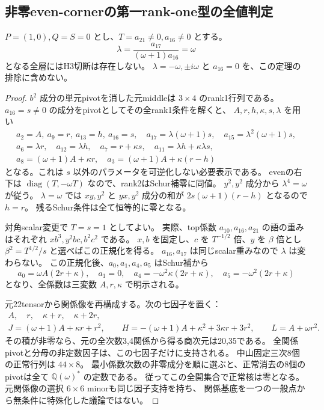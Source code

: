 \subsection{非零even-cornerの第一rank-one型の全値判定}
\label{subsec:cubic-third-root-unit-onezero-plus}
\begin{theorem}[片方零結合の $\lambda=\omega$ 型も空]
\label{thm:cubic-third-root-unit-onezero-plus-empty}
$P=(1,0),Q=S=0$ とし、$T=a_{21}\ne0,a_{16}\ne0$ とする。
\[
 \lambda=\frac{a_{17}}{(\omega+1)a_{16}}=\omega
\]
となる全層にはH3切断は存在しない。
$\lambda=-\omega,\pm i\omega$ と $a_{16}=0$ を、この定理の排除に含めない。
\end{theorem}
\begin{proof}
$b^2$ 成分の単元pivotを消した元middleは $3\times4$ のrank1行列である。
$a_{16}=s\ne0$ の成分をpivotとしてその全rank1条件を解くと、
$A,r,h,\kappa,s,\lambda$ を用い
\begin{gather*}
 a_2=A,\ a_9=r,\ a_{13}=h,\ a_{16}=s,\quad
 a_{17}=\lambda(\omega+1)s,\quad a_{15}=\lambda^2(\omega+1)s,\\
 a_6=\lambda r,\quad a_{12}=\lambda h,\quad
 a_7=r+\kappa s,\quad a_{11}=\lambda h+\kappa\lambda s,\\
 a_8=(\omega+1)A+\kappa r,\quad
 a_3=(\omega+1)A+\kappa(r-h)
\end{gather*}
となる。これは $s$ 以外のパラメータを可逆化しない必要表示である。
evenの右下は $\operatorname{diag}(T,-\omega T)$ なので、rank2はSchur補零に同値。
$y^2,y^2$ 成分から $\lambda^4=\omega$ が従う。
$\lambda=\omega$ では $xy,y^2$ と $yx,y^2$ 成分の和が
$2s(\omega+1)(r-h)$ となるので $h=r$。
残るSchur条件は全て恒等的に零となる。

対角scalar変更で $T=s=1$ としてよい。
実際、top係数 $a_{10},a_{16},a_{21}$ の語の重みはそれぞれ
$xb^3,y^2bc,b^2c^2$ である。
$x,b$ を固定し、$c$ を $T^{-1/2}$ 倍、$y$ を $\beta$ 倍とし
$\beta^2=T^{1/2}/s$ と選べばこの正規化を得る。
$a_{16},a_{17}$ は同じscalar重みなので $\lambda$ は変わらない。
この正規化後、$a_0,a_1,a_4,a_5$ はSchur補から
\[
 a_0=\omega A(2r+\kappa),\quad a_1=0,\quad
 a_4=-\omega^2\kappa(2r+\kappa),\quad a_5=-\omega^2(2r+\kappa)
\]
となり、全係数は三変数 $A,r,\kappa$ で明示される。

元22tensorから関係像を再構成する。次の七因子を置く：
\begin{gather*}
 A,\quad r,\quad \kappa+r,\quad \kappa+2r,\\
 J=(\omega+1)A+\kappa r+r^2,\qquad
 H=-(\omega+1)A+\kappa^2+3\kappa r+3r^2,\qquad
 L=A+\omega r^2.
\end{gather*}
その積が非零なら、元の全次数3,4関係から得る商次元は20,35である。
全関係pivotと分母の非定数因子は、この七因子だけに支持される。
中山固定三次8個の正常行列は $44\times8$。
最小係数次数の非零成分を順に選ぶと、正常消去の8個のpivotは全て
$\mathbb Q(\omega)^*$ の定数である。
従ってこの全開集合で正常核は零となる。
元関係像の選択 $6\times6$ minorも同じ因子支持を持ち、
関係基底を一つの一般点から無条件に特殊化した議論ではない。


\end{proof}
